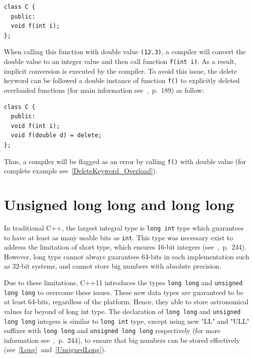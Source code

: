 \documentclass[11pt]{report}
\begin{document}
\begin{lstlisting}
class C {
  public:
  void f(int i);
};
\end{lstlisting}
 When calling this function with double value \texttt{(12.3)}, a compiler will convert the double value to an integer value and then call function \texttt{f(int i)}. As a result, implicit conversion is executed by the compiler. To avoid this issue, the delete keyword can be followed a double instance of function \texttt{f()} to explicitly deleted overloaded functions (for main information see~\cite{Gregorie:professionalcpp},~p.~189) as follow:
\begin{lstlisting}
class C {
  public:
  void f(int i);
  void f(double d) = delete;
};
\end{lstlisting}
Thus, a compiler will be flagged as an error by calling \texttt{f()} with double value (for complete example see~\ref{DeleteKeyword_Overload}).

\section{Unsigned long long and long long}
\label{section: Unsigned and long long (int)}
In traditional C++, the largest integral type is \texttt{long int} type which guarantees to have at least as many usable bits as \texttt{int}. This type was necessary exist to address the limitation of short type, which ensures 16-bit integers (see~\cite{Overland:2011:CWF},~p.~244). However, long type cannot always guarantees 64-bits in each implementation such as 32-bit systems, and cannot store big numbers with absolute precision.

Due to these limitations, C++11 introduces the types \texttt{long long} and \texttt{unsigned long long} to overcome these issues. These new data types are guaranteed to be at least 64-bits, regardless of the platform. Hence, they able to store astronomical values far beyond of long int type. The declaration of \texttt{long long} and \texttt{unsigned long long} integers is similar to \texttt{long int} type, except using new "LL" and "ULL" suffixes with \texttt{long long} and \texttt{unsigned long long} respectively (for more information see~\cite{Overland:2011:CWF},~p.~244), to ensure that big numbers can be stored effectively (see~\ref{Long}~and~\ref{UnsignedLong}).

\end{document}
